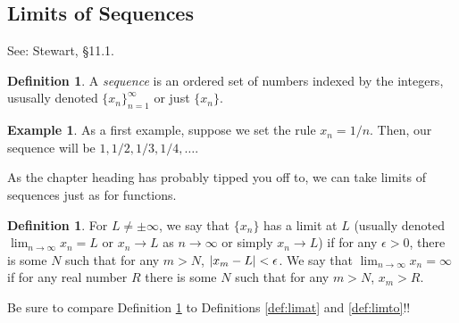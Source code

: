 \documentclass[english]{book}
\DeclarePairedDelimiter\abs{\lvert}{\rvert}%
\newtheorem{corollary}[theorem]{Corollary}
\theoremstyle{remark}
\theoremstyle{definition}
\newtheorem{exle}[theorem]{Example}
\newtheorem{definition}[theorem]{Definition}
\newtheorem*{next week}{Next Week}
\newcommand{\dlim}{\displaystyle\lim}
\begin{document}
\subsection{Limits of Sequences}
See: Stewart, \S 11.1.
\begin{definition}
	A \emph{sequence} is an ordered set of numbers indexed by the integers, ususally denoted $\{x_n\}_{n=1}^\infty$ or just $\{x_n\}$.
\end{definition}
\begin{exle}
	As a first example, suppose we set the rule $x_n=1/n$. Then, our sequence will be $1,1/2,1/3,1/4,\dots$. 
\end{exle}
As the chapter heading has probably tipped you off to, we can take limits of sequences just as for functions.
\begin{definition}\label{def:seqlim}
	For $L\neq \pm \infty$, we say that $\{x_n\}$ has a limit at $L$ (usually denoted $\dlim_{n\to\infty}x_n=L$ or $x_n\to L$ as $n\to \infty$ or simply $x_n\to L$) if for any $\epsilon>0$, there is some $N$ such that for any $m>N$, $\abs{x_m-L}<\epsilon$. We say that $\dlim_{n\to \infty}x_n=\infty$ if for any real number $R$ there is some $N$ such that for any $m>N$, $x_m>R$.
	\end{definition}
Be sure to compare Definition \ref{def:seqlim} to Definitions \ref{def:limat} and \ref{def:limto}!!



\end{document}
